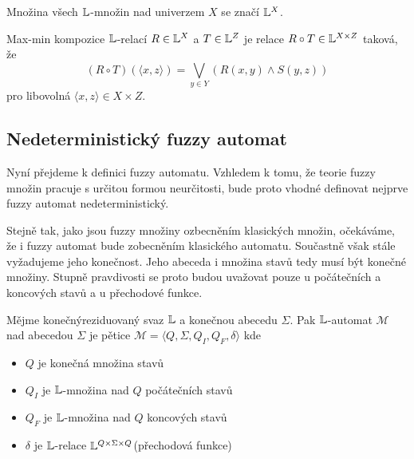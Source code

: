 \documentclass[a4paper,10pt]{article}
\begin{document}
Množina všech $\mathbb{L}$-množin nad univerzem $X$ se značí $\mathbb{L}^X$.



\cite{klir-yuan-fuzzy-sets-and-logic}

\begin{definition}\label{max-min-composition}
Max-min kompozice $\mathbb{L}$-relací $R \in \mathbb{L}^X$ a $T \in \mathbb{L}^Z$ je relace $R \circ T  \in \mathbb{L}^{X \times Z}$ taková, že
$$
  (R \circ T) (\langle x, z \rangle) = \bigvee_{y \in Y} (R(x, y) \wedge S(y, z))
$$
pro libovolná $\langle x, z \rangle \in X \times Z$.
 
\end{definition}


\subsection{Nedeterministický fuzzy automat}
Nyní přejdeme k definici fuzzy automatu. Vzhledem k tomu, že teorie fuzzy množin pracuje s určitou formou neurčitosti, bude proto vhodné definovat nejprve fuzzy automat nedeterministický.

Stejně tak, jako jsou fuzzy množiny ozbecněním klasických množin, očekáváme, že i fuzzy automat bude zobecněním klasického automatu. Součastně však stále vyžadujeme jeho konečnost. Jeho abeceda i množina stavů tedy musí být konečné  množiny. Stupně pravdivosti se proto budou uvažovat pouze u počátečních a koncových stavů a u přechodové funkce.
 
\begin{definition}\label{fuzzy-automata}
Mějme konečný\RLY reziduovaný svaz $\mathbb{L}$ a konečnou abecedu $\Sigma$. Pak $\mathbb{L}$-automat $\mathcal{M}$ nad abecedou $\Sigma$ je pětice $\mathcal{M} = \langle Q, \Sigma, Q_I, Q_F, \delta \rangle$ kde
\begin{itemize}
 \item[] $Q$ je konečná množina stavů
 \item[] $Q_I$ je $\mathbb{L}$-množina nad $Q$ počátečních stavů
 \item[] $Q_F$ je $\mathbb{L}$-množina nad $Q$ koncových stavů
 \item[] $\delta$ je $\mathbb{L}$-relace $\mathbb{L}^{Q \times \Sigma \times Q}$\RLY (přechodová funkce)
\end{itemize}
\end{definition}
\end{document}

